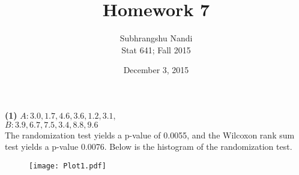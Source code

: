\documentclass[11pt,a4paper]{article}
\begin{document}
\title{Homework 7}
\author{Subhrangshu Nandi\\
  Stat 641; Fall 2015}
\date{December 3, 2015}

\maketitle

\noindent
\textbf{(1)} $A: 3.0, 1.7, 4.6, 3.6, 1.2, 3.1$, \\$B: 3.9, 6.7, 7.5, 3.4, 8.8, 9.6$ \\
The randomization test yields a p-value of 0.0055, and the Wilcoxon rank sum test yields a p-value 0.0076. Below is the histogram of the randomization test.
\begin{figure}[H]
\centering
\texttt{[image: Plot1.pdf]}
\end{figure}
\end{document}
